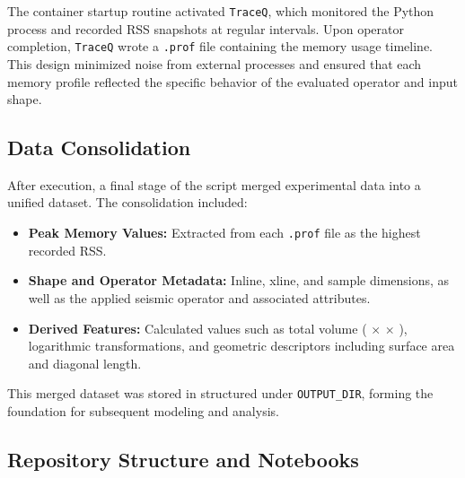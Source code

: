 The container startup routine activated \texttt{TraceQ}, which monitored the Python process and recorded \ac{RSS} snapshots at regular intervals.
Upon operator completion, \texttt{TraceQ} wrote a \texttt{.prof} file containing the memory usage timeline.
This design minimized noise from external processes and ensured that each memory profile reflected the specific behavior of the evaluated operator and input shape.

\subsection{Data Consolidation}
\label{subsec:data-consolidation}

After execution, a final stage of the script merged experimental data into a unified dataset.
The consolidation included:

\begin{itemize}
    \item \textbf{Peak Memory Values:} Extracted from each \texttt{.prof} file as the highest recorded \ac{RSS}.
    \item \textbf{Shape and Operator Metadata:} Inline, xline, and sample dimensions, as well as the applied seismic operator and associated attributes.
    \item \textbf{Derived Features:} Calculated values such as total volume ( $\times$  $\times$ ), logarithmic transformations, and geometric descriptors including surface area and diagonal length.
\end{itemize}

This merged dataset was stored in structured  under \texttt{OUTPUT\_DIR}, forming the foundation for subsequent modeling and analysis.

\subsection{Repository Structure and Notebooks}
\label{subsec:repository-structure-and-notebooks}


